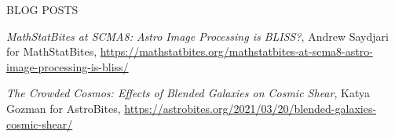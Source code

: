 \documentclass{resume} %
\begin{document}

\begin{rSection}{BLOG POSTS}
%
\vspace*{-1em}

\item \textit{MathStatBites at SCMA8: Astro Image Processing is BLISS?}, Andrew Saydjari for MathStatBites, \url{https://mathstatbites.org/mathstatbites-at-scma8-astro-image-processing-is-bliss/}

\item \textit{The Crowded Cosmos: Effects of Blended Galaxies on Cosmic Shear}, Katya Gozman for AstroBites, \url{https://astrobites.org/2021/03/20/blended-galaxies-cosmic-shear/}

\end{rSection}
\end{document}
